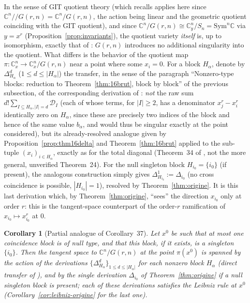 \documentclass[10pt,a4paper]{amsart}
\newtheorem{corollary}[theorem]{Corollary}
\newcommand{\CC}{\mathbb{C}}
\begin{document}
In the sense of GIT quotient theory \cite{MFK} (which \cite{Ze} recalls applies here since $\CC^n/\!\!/G(r,n)=\CC^n/G(r,n)$, the action being linear and the geometric quotient coinciding with the GIT quotient), and since $\CC^n/G(r,n)\cong\CC^n_y/S_n=\mathrm{Sym}^n\CC$ via $y=x^r$ (Proposition~\ref{prop:invariants}), the quotient variety \emph{itself} is, up to isomorphism, exactly that of \cite{Ze}: $G(r,n)$ introduces no additional singularity into the quotient. What differs is the behavior of the quotient map $\pi:\CC^n_x\to\CC^n_x/G(r,n)$ near a point where some $x_i=0$. For a block $H_\alpha$, denote by $\Delta_{H_\alpha}^d$ ($1\le d\le|H_\alpha|$) the transfer, in the sense of the paragraph ``Nonzero-type blocks: reduction to Theorem~\ref{thm:16brut}, block by block'' of the previous subsection, of the corresponding derivation of \cite[Corollary~37]{Ze}: \emph{not} the raw sum $d!\sum_{I\subseteq H_\alpha,|I|=d}\mathcal D_I$ (each of whose terms, for $|I|\ge2$, has a denominator $x_j^r-x_i^r$ identically zero on $H_\alpha$, since these are precisely two indices of the block and hence of the same value $b_\alpha$, and would thus be singular exactly at the point considered), but its already-resolved analogue given by Proposition~\ref{prop:thm16delta} and Theorem~\ref{thm:16brut} applied to the sub-tuple $(x_i)_{i\in H_\alpha}$, exactly as for the total diagonal (Theorem~34 of \cite{Ze}, not the more general, unverified Theorem~24). For the null singleton block $H_{i_0}=\{i_0\}$ (if present), the analogous construction simply gives $\Delta_{H_{i_0}}^1:=\Delta_{i_0}$ (no cross coincidence is possible, $|H_{i_0}|=1$), resolved by Theorem~\ref{thm:origine}. It is this last derivation which, by Theorem~\ref{thm:origine}, ``sees'' the direction $x_{i_0}$ only at order $r$: this is the tangent-space counterpart of the order-$r$ ramification of $x_{i_0}\mapsto x_{i_0}^r$ at $0$.

\begin{corollary}[Partial analogue of Corollary~37]\label{cor:git-partiel}
Let $x^0$ be such that at most one coincidence block is of null type, and that this block, if it exists, is a singleton $\{i_0\}$. Then the tangent space to $\CC^n/G(r,n)$ at the point $\pi(x^0)$ is spanned by the action of the derivations $\{\Delta_{H_\alpha}^d\}_{1\le d\le|H_\alpha|}$ for each nonzero block $H_\alpha$ (direct transfer of \cite[Corollary~37]{Ze}), and by the single derivation $\Delta_{i_0}$ of Theorem~\ref{thm:origine} if a null singleton block is present; each of these derivations satisfies the Leibniz rule at $x^0$ (Corollary~\ref{cor:leibniz-origine} for the last one).
\end{corollary}
\end{document}
